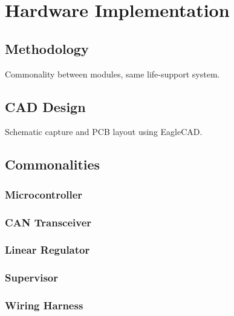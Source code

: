 \section{Hardware Implementation\label{sec:Hardware-Implementation}}


\subsection{Methodology}

Commonality between modules, same life-support system.


\subsection{CAD Design}

Schematic capture and PCB layout using EagleCAD.


\subsection{Commonalities}


\subsubsection{Microcontroller}


\subsubsection{CAN Transceiver}


\subsubsection{Linear Regulator}


\subsubsection{Supervisor}


\subsubsection{Wiring Harness}








